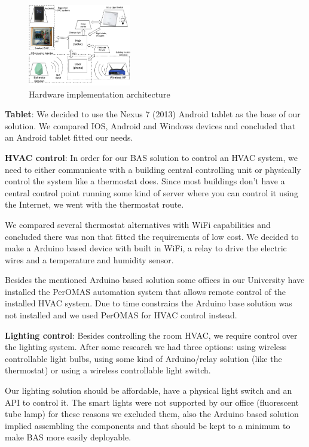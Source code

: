 \documentclass[conference]{IEEEtran}
\begin{document}
\begin{figure}[h]
\centering
\includegraphics[width=0.4\textwidth]{Figures/harware_arch_imp}
\caption{Hardware implementation architecture}
\label{imp:architecture_system}
\end{figure}

\textbf{Tablet}: We decided to use the Nexus 7 (2013) Android tablet as the base of our solution. We compared IOS, Android and Windows devices and concluded that an Android tablet fitted our needs.

\textbf{HVAC control}: In order for our \ac{BAS} solution to control an \ac{HVAC} system, we need to either communicate with a building central controlling unit or physically control the system like a thermostat does. Since most buildings don't have a central control point running some kind of server where you can control it using the Internet, we went with the thermostat route.

We compared several thermostat alternatives with WiFi capabilities and concluded there was non that fitted the requirements of low cost. We decided to make a Arduino based device with built in \ac{WiFi}, a relay to drive the electric wires and a temperature and humidity sensor. 

Besides the mentioned Arduino based solution some offices in our University have installed the PerOMAS automation system that allows remote control of the installed HVAC system. Due to time constrains the Arduino base solution was not installed and we used PerOMAS for HVAC control instead.





\textbf{Lighting control}:
Besides controlling the room \ac{HVAC}, we require control over the lighting system. After some research we had three options: using wireless controllable light bulbs, using some kind of Arduino/relay solution (like the thermostat) or using a wireless controllable light switch.

Our lighting solution should be affordable, have a physical light switch and an API to control it. The smart lights were not supported by our office (fluorescent tube lamp) for these reasons we excluded them, also the Arduino based solution implied assembling the components and that should be kept to a minimum to make BAS more easily deployable.
\end{document}
